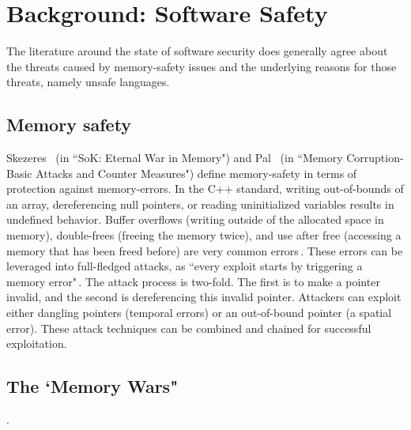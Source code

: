 \documentclass[nomenclature, english, bibtex]{kththesis}
\begin{document}

\section{Background: Software Safety}
\label{sec:software_safety}

The literature around the state of software security does  generally agree about the threats caused by memory-safety issues and the underlying reasons for those threats, namely unsafe languages. 

\subsection{Memory safety}

Skezeres \etal\,\cite{szekeres_sok_2013} (in ``SoK: Eternal War in Memory") and Pal \etal\,\cite{pal_memory_2016} (in ``Memory Corruption-Basic Attacks and Counter Measures") define \gls{memory-safety} in terms of protection against \gls{memory-error}s. 
In the C++ standard, writing out-of-bounds of an array, dereferencing null pointers, or reading uninitialized variables results in undefined behavior. Buffer overflows (writing outside of the allocated space in memory), double-frees (freeing the memory twice), and use after free (accessing a memory that has been freed before) are very common errors\,\cite{szekeres_sok_2013,scherer_engineering_2021}. 
These errors can be leveraged into full-fledged attacks, as ``every exploit starts by triggering a memory error"\,\cite{szekeres_sok_2013}. The attack process is two-fold. The first is to make a pointer invalid, and the second is dereferencing this invalid pointer. Attackers can exploit either dangling pointers (\ie temporal errors) or an out-of-bound pointer (\ie a spatial error). These attack techniques can be combined and chained for successful exploitation. 

\subsection{The `Memory Wars"}.
\end{document}
